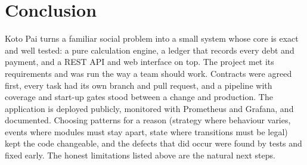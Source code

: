 \documentclass[10pt,a4paper]{article}
\begin{document}
\section{Conclusion}

Koto Pai turns a familiar social problem into a small system whose core is exact and well tested: a pure calculation
engine, a ledger that records every debt and payment, and a REST API and web interface on top. The project met its
requirements and was run the way a team should work. Contracts were agreed first, every task had its own branch and
pull request, and a pipeline with coverage and start-up gates stood between a change and production. The application is
deployed publicly, monitored with Prometheus and Grafana, and documented. Choosing patterns for a reason (strategy
where behaviour varies, events where modules must stay apart, state where transitions must be legal) kept the code
changeable, and the defects that did occur were found by tests and fixed early. The honest limitations listed above are
the natural next steps.
\end{document}
